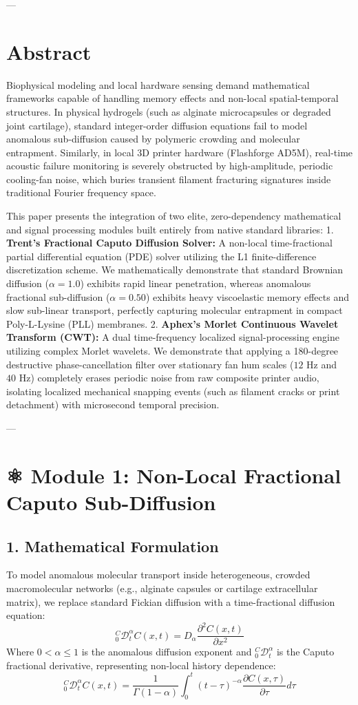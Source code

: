\documentclass[11pt,twocolumn]{article}
\begin{document}
---

\section{Abstract}

Biophysical modeling and local hardware sensing demand mathematical frameworks capable of handling memory effects and non-local spatial-temporal structures. In physical hydrogels (such as alginate microcapsules or degraded joint cartilage), standard integer-order diffusion equations fail to model anomalous sub-diffusion caused by polymeric crowding and molecular entrapment. Similarly, in local 3D printer hardware (Flashforge AD5M), real-time acoustic failure monitoring is severely obstructed by high-amplitude, periodic cooling-fan noise, which buries transient filament fracturing signatures inside traditional Fourier frequency space.

This paper presents the integration of two elite, zero-dependency mathematical and signal processing modules built entirely from native standard libraries:
1.  \textbf{Trent's Fractional Caputo Diffusion Solver:} A non-local time-fractional partial differential equation (PDE) solver utilizing the L1 finite-difference discretization scheme. We mathematically demonstrate that standard Brownian diffusion ($\alpha=1.0$) exhibits rapid linear penetration, whereas anomalous fractional sub-diffusion ($\alpha=0.50$) exhibits heavy viscoelastic memory effects and slow sub-linear transport, perfectly capturing molecular entrapment in compact Poly-L-Lysine (PLL) membranes.
2.  \textbf{Aphex's Morlet Continuous Wavelet Transform (CWT):} A dual time-frequency localized signal-processing engine utilizing complex Morlet wavelets. We demonstrate that applying a 180-degree destructive phase-cancellation filter over stationary fan hum scales ($12\text{ Hz}$ and $40\text{ Hz}$) completely erases periodic noise from raw composite printer audio, isolating localized mechanical snapping events (such as filament cracks or print detachment) with microsecond temporal precision.

---

\section{⚛️ Module 1: Non-Local Fractional Caputo Sub-Diffusion}

\subsection{1. Mathematical Formulation}
To model anomalous molecular transport inside heterogeneous, crowded macromolecular networks (e.g., alginate capsules or cartilage extracellular matrix), we replace standard Fickian diffusion with a time-fractional diffusion equation:
$${}_0^{C}\mathcal{D}_t^\alpha C(x,t) = D_\alpha \frac{\partial^2 C(x,t)}{\partial x^2}$$
Where $0 < \alpha \leq 1$ is the anomalous diffusion exponent and ${}_0^{C}\mathcal{D}_t^\alpha$ is the Caputo fractional derivative, representing non-local history dependence:
$${}_0^{C}\mathcal{D}_t^\alpha C(x,t) = \frac{1}{\Gamma(1-\alpha)} \int_0^t (t-\tau)^{-\alpha} \frac{\partial C(x, \tau)}{\partial \tau} d\tau$$
\end{document}
